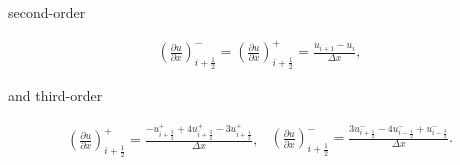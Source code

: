 \documentclass[SingleSpace,12pt]{Serre_ASCE}
\begin{document}
second-order
\begin{linenomath*}
\begin{gather}\label{eq:derivdisco2}
\left(\frac{\partial u}{\partial x}\right)^-_{i + \frac{1}{2}} = \left(\frac{\partial u}{\partial x}\right)^+_{i + \frac{1}{2}} = \frac{u_{i + 1} - u_{i}}{\Delta x},
\end{gather}
\end{linenomath*}
and third-order
\begin{linenomath*}
\begin{subequations}
\begin{gather}\label{eq:derivdisco3p}
\left(\frac{\partial u}{\partial x}\right)^+_{i + \frac{1}{2}} = \frac{ -u^+_{i + \frac{3}{2}} + 4u^+_{i + \frac{3}{2}}  -3 u^+_{i + \frac{1}{2}}}{\Delta x},
\end{gather}
\begin{gather}\label{eq:derivdisco3m}
\left(\frac{\partial u}{\partial x}\right)^-_{i + \frac{1}{2}} = \frac{ 3u^-_{i + \frac{1}{2}} - 4u^-_{i - \frac{1}{2}} + u^-_{i - \frac{3}{2}}}{\Delta x}.
\end{gather}
\end{subequations}
\label{eq:derivdisco3}
\end{linenomath*}
\end{document}
